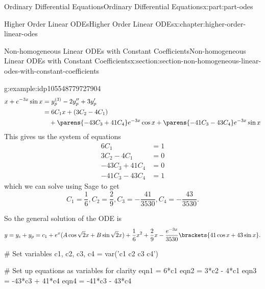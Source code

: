 \documentclass[oneside,10pt,]{book}
\numberwithin{equation}{part}
\newcommand{\amp}{&}
\begin{document}
\begin{partptx}{Ordinary Differential Equations}{}{Ordinary Differential Equations}{}{}{x:part:part-odes}
\begin{chapterptx}{Higher Order Linear ODEs}{}{Higher Order Linear ODEs}{}{}{x:chapter:higher-order-linear-odes}
\begin{sectionptx}{Non-homogeneous Linear ODEs with Constant Coefficients}{}{Non-homogeneous Linear ODEs with Constant Coefficients}{}{}{x:section:section-non-homogeneous-linear-odes-with-constant-coefficients}
\begin{example}{}{g:example:idp105548779727904}
\begin{align*}
x+e^{-3x}\sin x \amp= y^{(3)}_{p}-2y''_{p}+3y'_{p}\\
\amp= 6C_{1}x+(3C_{2}-4C_{1}) \\
\amp\quad + \parens{-43C_{3}+41C_{4}}e^{-3x}\cos x+\parens{-41C_{3}-43C_{4}}e^{-3x}\sin x
\end{align*}
This gives us the system of equations%
\begin{align*}
6C_{1}  \amp=  1\\
3C_{2}-4C_{1} \amp=  0\\
-43C_{3}+41C_{4}  \amp=  0\\
-41C_{3}-43C_{4}  \amp= 1
\end{align*}
which we can solve using Sage to get%
\begin{equation*}
C_{1} = \frac{1}{6},C_{2} = \frac{2}{9},C_{3} = -\frac{41}{3530},C_{4}=-\frac{43}{3530}.
\end{equation*}
%
\par
So the general solution of the ODE is%
\begin{equation*}
y = y_{c}+y_{p} = c_{1}+e^{x}(A\cos\sqrt{2}x+B\sin\sqrt{2}x) +\frac{1}{6}x^{2}+\frac{2}{9}x-\frac{e^{-3x}}{3530}\brackets{41\cos x+43\sin x}.
\end{equation*}
%
\end{example}
\begin{sageinput}
# Set variables
c1, c2, c3, c4 = var('c1 c2 c3 c4')

# Set up equations as variables for clarity
eqn1 = 6*c1
eqn2 = 3*c2 - 4*c1
eqn3 = -43*c3 + 41*c4
eqn4 = -41*c3 - 43*c4


\end{sageinput}
\end{sectionptx}
\end{chapterptx}
\end{partptx}
\end{document}
